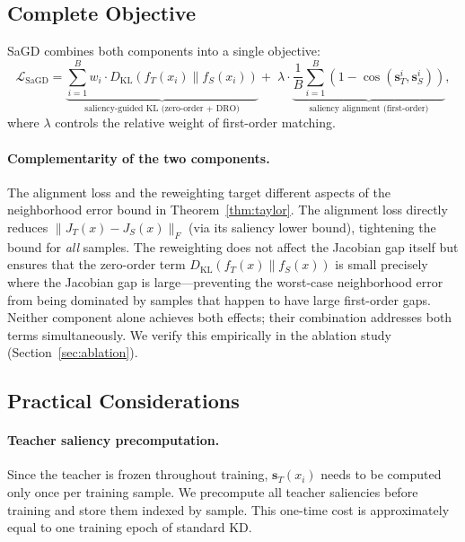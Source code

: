 \subsection{Complete Objective}\label{sec:full-loss}

SaGD combines both components into a single objective:
\begin{equation}\label{eq:sagd-full}
\mathcal{L}_\mathrm{SaGD} = \underbrace{\sum_{i=1}^B w_i \cdot D_\mathrm{KL}(f_T(x_i) \| f_S(x_i))}_{\text{saliency-guided KL (zero-order + DRO)}} + \;\lambda \cdot \underbrace{\frac{1}{B}\sum_{i=1}^B \left(1 - \cos(\mathbf{s}_T^i, \mathbf{s}_S^i)\right)}_{\text{saliency alignment (first-order)}},
\end{equation}
where $\lambda$ controls the relative weight of first-order matching.

\paragraph{Complementarity of the two components.}
The alignment loss and the reweighting target different aspects of the neighborhood error bound in Theorem~\ref{thm:taylor}.
The alignment loss directly reduces $\|J_T(x) - J_S(x)\|_F$ (via its saliency lower bound), tightening the bound for \emph{all} samples.
The reweighting does not affect the Jacobian gap itself but ensures that the zero-order term $D_\mathrm{KL}(f_T(x) \| f_S(x))$ is small precisely where the Jacobian gap is large---preventing the worst-case neighborhood error from being dominated by samples that happen to have large first-order gaps.
Neither component alone achieves both effects; their combination addresses both terms simultaneously.
We verify this empirically in the ablation study (Section~\ref{sec:ablation}).


\subsection{Practical Considerations}\label{sec:practical}

\paragraph{Teacher saliency precomputation.}
Since the teacher is frozen throughout training, $\mathbf{s}_T(x_i)$ needs to be computed only once per training sample.
We precompute all teacher saliencies before training and store them indexed by sample.
This one-time cost is approximately equal to one training epoch of standard KD.

